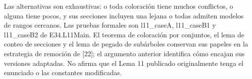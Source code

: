 \documentclass[spanish,11pt,a4paper]{article}
\begin{document}
Las alternativas son exhaustivas: o toda coloración tiene muchos conflictos, o alguna tiene pocos, y sus secciones incluyen una lejana o todas admiten modelos de rangos cercanos. Las pruebas formales son {\ttfamily\small l11\_\discretionary{\hbox{\ensuremath{\hookrightarrow}}}{}{}caseA}, {\ttfamily\small l11\_\discretionary{\hbox{\ensuremath{\hookrightarrow}}}{}{}caseB1} y {\ttfamily\small l11\_\discretionary{\hbox{\ensuremath{\hookrightarrow}}}{}{}caseB2} de {\ttfamily\small E34.\discretionary{\hbox{\ensuremath{\hookrightarrow}}}{}{}L11Main}. El teorema de coloración por conjuntos, el lema de conteo de secciones y el lema de pegado de subárboles conservan sus papeles en la estrategia de remoción de {[}22{]}; el argumento anterior identifica cómo encajan sus versiones adaptadas. No afirma que el Lema 11 publicado originalmente tenga el enunciado o las constantes modificadas.
\end{document}
